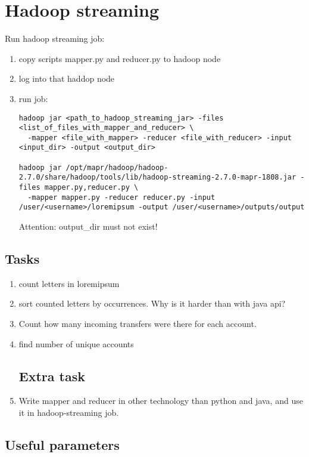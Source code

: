 \documentclass{article}
\begin{document}
\section*{Hadoop streaming}

Run hadoop streaming job:
\begin{enumerate}
\item copy scripts mapper.py and reducer.py to hadoop node
\item log into that haddop node
\item run job:
\begin{lstlisting}[]
hadoop jar <path_to_hadoop_streaming_jar> -files <list_of_files_with_mapper_and_reducer> \
  -mapper <file_with_mapper> -reducer <file_with_reducer> -input <input_dir> -output <output_dir>

hadoop jar /opt/mapr/hadoop/hadoop-2.7.0/share/hadoop/tools/lib/hadoop-streaming-2.7.0-mapr-1808.jar -files mapper.py,reducer.py \
  -mapper mapper.py -reducer reducer.py -input /user/<username>/loremipsum -output /user/<username>/outputs/output
\end{lstlisting}

Attention: output\_dir must not exist!
\end{enumerate}

\subsection*{Tasks}

\begin{enumerate}
\item count letters in loremipsum
\item sort counted letters by occurrences. Why is it harder than with java api?
\item Count how many incoming transfers were there for each account.
\item find number of unique accounts

\subsection*{Extra task}
\item Write mapper and reducer in other technology than python and java, and use it in hadoop-streaming job.
\end{enumerate}

\subsection*{Useful parameters}
\end{document}
